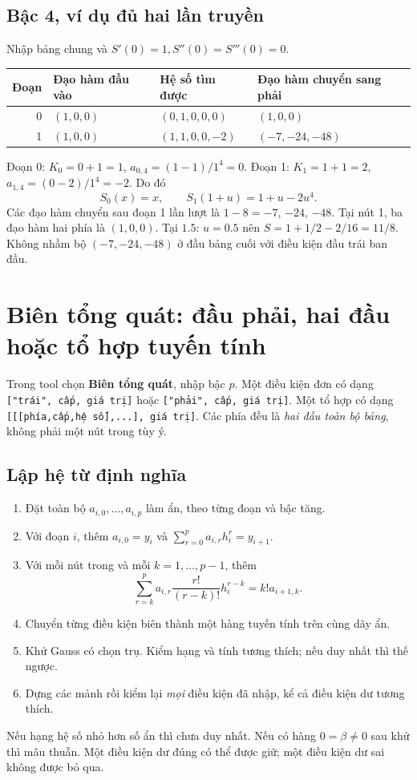 \subsection{Bậc 4, ví dụ đủ hai lần truyền}
\label{sec:spline-quartic-left}
Nhập bảng chung và $S'(0)=1,S''(0)=S'''(0)=0$.
\begin{center}\small
\begin{tabular}{rp{.25\linewidth}p{.25\linewidth}p{.25\linewidth}}
\toprule
Đoạn & Đạo hàm đầu vào & Hệ số tìm được & Đạo hàm chuyển sang phải\\ \midrule
0 & $(1,0,0)$ & $(0,1,0,0,0)$ & $(1,0,0)$\\
1 & $(1,0,0)$ & $(1,1,0,0,-2)$ & $(-7,-24,-48)$\\ \bottomrule
\end{tabular}\end{center}
Đoạn 0: $K_0=0+1=1$, $a_{0,4}=(1-1)/1^4=0$.
Đoạn 1: $K_1=1+1=2$, $a_{1,4}=(0-2)/1^4=-2$.
Do đó
\[
S_0(x)=x,\qquad S_1(1+u)=1+u-2u^4.
\]
Các đạo hàm chuyển sau đoạn 1 lần lượt là
$1-8=-7$, $-24$, $-48$. Tại nút 1, ba đạo hàm hai phía là $(1,0,0)$.
Tại $1.5$: $u=0.5$ nên $S=1+1/2-2/16=11/8$.
Không nhầm bộ $(-7,-24,-48)$ ở đầu bảng cuối với điều kiện đầu trái ban đầu.

\section{Biên tổng quát: đầu phải, hai đầu hoặc tổ hợp tuyến tính}
\label{sec:spline-general-boundary}
Trong tool chọn \textbf{Biên tổng quát}, nhập bậc $p$.
Một điều kiện đơn có dạng \texttt{["trái", cấp, giá trị]} hoặc
\texttt{["phải", cấp, giá trị]}. Một tổ hợp có dạng
\texttt{[[[phía,cấp,hệ số],...], giá trị]}.
Các phía đều là \emph{hai đầu toàn bộ bảng}, không phải một nút trong tùy ý.

\subsection{Lập hệ từ định nghĩa}
\label{sec:spline-general-system}
\begin{enumerate}
\item Đặt toàn bộ $a_{i,0},\ldots,a_{i,p}$ làm ẩn, theo từng đoạn và bậc tăng.
\item Với đoạn $i$, thêm $a_{i,0}=y_i$ và $\sum_{r=0}^p a_{i,r}h_i^r=y_{i+1}$.
\item Với mỗi nút trong và mỗi $k=1,\ldots,p-1$, thêm
\[
\sum_{r=k}^p a_{i,r}\frac{r!}{(r-k)!}h_i^{r-k}=k!a_{i+1,k}.
\]
\item Chuyển từng điều kiện biên thành một hàng tuyến tính trên cùng dãy ẩn.
\item Khử Gauss có chọn trụ. Kiểm hạng và tính tương thích; nếu duy nhất thì thế ngược.
\item Dựng các mảnh rồi kiểm lại \emph{mọi} điều kiện đã nhập, kể cả điều kiện dư tương thích.
\end{enumerate}
Nếu hạng hệ số nhỏ hơn số ẩn thì chưa duy nhất. Nếu có hàng $0=\beta\ne0$ sau khử thì mâu thuẫn.
Một điều kiện dư đúng có thể được giữ; một điều kiện dư sai không được bỏ qua.

